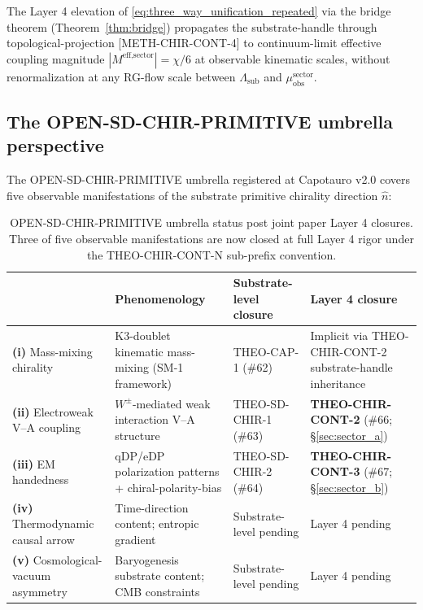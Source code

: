 \documentclass[11pt,letterpaper]{article}
\newcommand{\Lambdasub}{\Lambda_{\text{sub}}}
\newcommand{\muobs}{\mu_{\text{obs}}}
\newcommand{\methref}[1]{\textsf{\small[\textsc{#1}]}}
\begin{document}
The Layer 4 elevation of \eqref{eq:three_way_unification_repeated} via the bridge theorem (Theorem~\ref{thm:bridge}) propagates the substrate-handle through topological-projection \methref{METH-CHIR-CONT-4} to continuum-limit effective coupling magnitude $|M^{\text{eff,sector}}| = \chi/6$ at observable kinematic scales, without renormalization at any RG-flow scale between $\Lambdasub$ and $\muobs^{\text{sector}}$.

\subsection{The OPEN-SD-CHIR-PRIMITIVE umbrella perspective}
\label{sec:umbrella_perspective}

The OPEN-SD-CHIR-PRIMITIVE umbrella registered at Capotauro v2.0 \cite{Capotauro} covers five observable manifestations of the substrate primitive chirality direction $\hat{n}$:

\begin{table}[h!]
\caption{OPEN-SD-CHIR-PRIMITIVE umbrella status post joint paper Layer 4 closures. Three of five observable manifestations are now closed at full Layer 4 rigor under the THEO-CHIR-CONT-N sub-prefix convention.}
\label{tab:umbrella_status}
\begin{center}
\small
\begin{tabular}{lp{3.5cm}p{3cm}p{3.5cm}}
\toprule
& \textbf{Phenomenology} & \textbf{Substrate-level closure} & \textbf{Layer 4 closure} \\
\midrule
\textbf{(i)} Mass-mixing chirality & K3-doublet kinematic mass-mixing (SM-1 framework) & THEO-CAP-1 (\#62) & Implicit via THEO-CHIR-CONT-2 substrate-handle inheritance \\
\textbf{(ii)} Electroweak V--A coupling & $W^\pm$-mediated weak interaction V--A structure & THEO-SD-CHIR-1 (\#63) & \textbf{THEO-CHIR-CONT-2} (\#66; §\ref{sec:sector_a}) \\
\textbf{(iii)} EM handedness & qDP/eDP polarization patterns + chiral-polarity-bias & THEO-SD-CHIR-2 (\#64) & \textbf{THEO-CHIR-CONT-3} (\#67; §\ref{sec:sector_b}) \\
\textbf{(iv)} Thermodynamic causal arrow & Time-direction content; entropic gradient & Substrate-level pending & Layer 4 pending \\
\textbf{(v)} Cosmological-vacuum asymmetry & Baryogenesis substrate content; CMB constraints & Substrate-level pending & Layer 4 pending \\
\bottomrule
\end{tabular}
\end{center}
\end{table}
\end{document}
